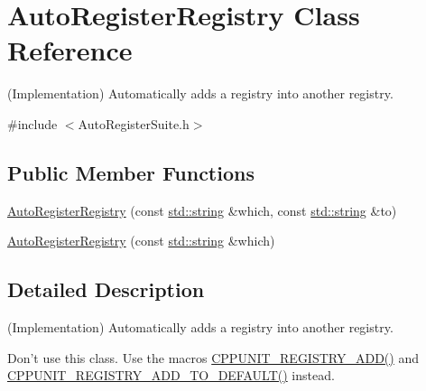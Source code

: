 \hypertarget{class_auto_register_registry}{\section{Auto\-Register\-Registry Class Reference}
\label{class_auto_register_registry}
}


(Implementation) Automatically adds a registry into another registry.  




{\ttfamily \#include $<$Auto\-Register\-Suite.\-h$>$}

\subsection*{Public Member Functions}
\begin{DoxyCompactItemize}
\item 
\hyperlink{class_auto_register_registry_aeb3c0171549420bc18714d4117d9c2b5}{Auto\-Register\-Registry} (const \hyperlink{glew_8h_ae84541b4f3d8e1ea24ec0f466a8c568b}{std\-::string} \&which, const \hyperlink{glew_8h_ae84541b4f3d8e1ea24ec0f466a8c568b}{std\-::string} \&to)
\item 
\hyperlink{class_auto_register_registry_a3efb50c6218f5d0e5969eb6fc8bccb23}{Auto\-Register\-Registry} (const \hyperlink{glew_8h_ae84541b4f3d8e1ea24ec0f466a8c568b}{std\-::string} \&which)
\end{DoxyCompactItemize}


\subsection{Detailed Description}
(Implementation) Automatically adds a registry into another registry. 

Don't use this class. Use the macros \hyperlink{_helper_macros_8h_a0785e2e8a821f70c69a8127c35c0a667}{C\-P\-P\-U\-N\-I\-T\-\_\-\-R\-E\-G\-I\-S\-T\-R\-Y\-\_\-\-A\-D\-D()} and \hyperlink{_helper_macros_8h_a9c3be3389213e1dc823ed580cc60878f}{C\-P\-P\-U\-N\-I\-T\-\_\-\-R\-E\-G\-I\-S\-T\-R\-Y\-\_\-\-A\-D\-D\-\_\-\-T\-O\-\_\-\-D\-E\-F\-A\-U\-L\-T()} instead. 

